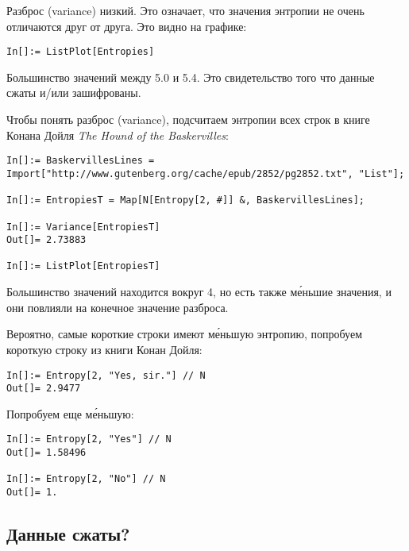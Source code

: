 Разброс (variance) низкий.
Это означает, что значения энтропии не очень отличаются друг от друга.
Это видно на графике:

\begin{lstlisting}
In[]:= ListPlot[Entropies]
\end{lstlisting}

\begin{figure}[H]
\centering
{}
\end{figure}

Большинство значений между 5.0 и 5.4.
Это свидетельство того что данные сжаты и/или зашифрованы.

Чтобы понять разброс (variance), подсчитаем энтропии всех строк в книге Конана Дойля \emph{The Hound of the Baskervilles}:

\begin{lstlisting}
In[]:= BaskervillesLines = Import["http://www.gutenberg.org/cache/epub/2852/pg2852.txt", "List"];

In[]:= EntropiesT = Map[N[Entropy[2, #]] &, BaskervillesLines];

In[]:= Variance[EntropiesT]
Out[]= 2.73883

In[]:= ListPlot[EntropiesT]
\end{lstlisting}

\begin{figure}[H]
\centering
{}
\end{figure}

Большинство значений находится вокруг 4, но есть также м\'{е}ньшие значения, и они повлияли на конечное значение разброса.

Вероятно, самые короткие строки имеют м\'{е}ньшую энтропию, попробуем короткую строку из книги Конан Дойля:

\begin{lstlisting}
In[]:= Entropy[2, "Yes, sir."] // N
Out[]= 2.9477
\end{lstlisting}

Попробуем еще м\'{е}ньшую:

\begin{lstlisting}
In[]:= Entropy[2, "Yes"] // N
Out[]= 1.58496

In[]:= Entropy[2, "No"] // N
Out[]= 1.
\end{lstlisting}

\subsection{Данные сжаты?}

